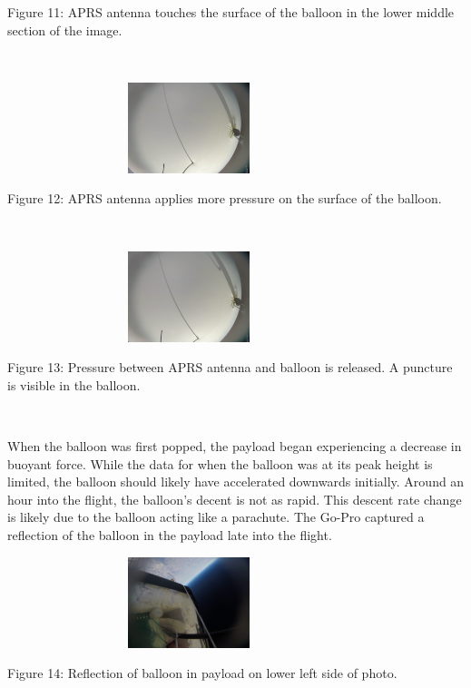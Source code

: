 \documentclass[12pt,]{article}
\begin{document}
Figure 11: APRS antenna touches the surface of the balloon in the lower
middle section of the image.

~

\begin{center}\includegraphics[width=400px,height=100px]{assets/IMAGEBREAKB} \end{center}

Figure 12: APRS antenna applies more pressure on the surface of the
balloon.

~

\begin{center}\includegraphics[width=400px,height=100px]{assets/IMAGEBREAKC} \end{center}

Figure 13: Pressure between APRS antenna and balloon is released. A
puncture is visible in the balloon.

~

When the balloon was first popped, the payload began experiencing a
decrease in buoyant force. While the data for when the balloon was at
its peak height is limited, the balloon should likely have accelerated
downwards initially. Around an hour into the flight, the balloon's
decent is not as rapid. This descent rate change is likely due to the
balloon acting like a parachute. The Go-Pro captured a reflection of the
balloon in the payload late into the flight.

\begin{center}\includegraphics[width=400px,height=100px]{assets/IMAGEBREAKD} \end{center}

Figure 14: Reflection of balloon in payload on lower left side of photo.
\end{document}
